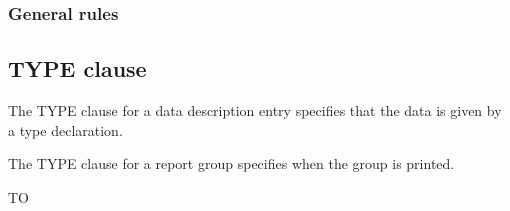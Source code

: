 \subsubsection{General rules}

\subsection{TYPE clause}

The TYPE clause for a data description entry specifies that the data is given by a type declaration.

The TYPE clause for a report group specifies when the group is printed.

\begin{syntax}
   TO 
\end{syntax}

